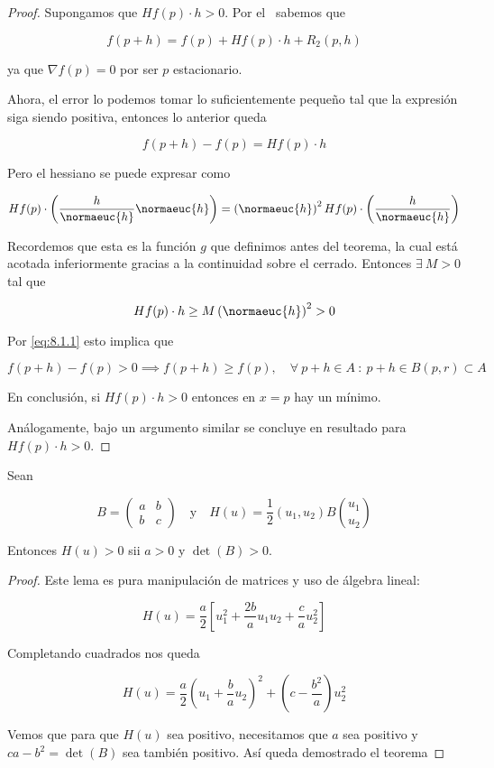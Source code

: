\begin{proof}
    Supongamos que $H f(p) \cdot h > 0$. Por el \Taylor~sabemos que
    
    \[
    f(p + h) = f(p) + H f(p) \cdot h + R_2(p,h)
    \]
    
    ya que $\nabla f(p) = 0$ por ser $p$ estacionario.
    
    Ahora, el error lo podemos tomar lo suficientemente pequeño tal que la expresión siga siendo positiva, entonces lo anterior queda
    
    \begin{equation}\label{eq:8.1.1}
        f(p+h) - f(p) = H f(p) \cdot h
    \end{equation}
    
    Pero el hessiano se puede expresar como
    
    \[
    H f(p) \cdot \left( \dfrac{h}{\normaeuc{h}}\normaeuc{h} \right) = \left(\normaeuc{h}\right)^2 H f(p) \cdot \left( \dfrac{h}{\normaeuc{h}} \right)
    \]
    
    Recordemos que esta es la función $g$ que definimos antes del teorema, la cual está acotada inferiormente gracias a la continuidad sobre el cerrado. Entonces $\exists~M > 0$ tal que
    
    \[
    H f(p) \cdot h \geq M \left(\normaeuc{h}\right)^2 > 0
    \]
    
    Por \ref{eq:8.1.1} esto implica que 
    
    \[
    f(p+h) - f(p) > 0 \implies f(p+h) \geq f(p), \quad \forall~p+h \in A~:~p+h \in B(p,r) \subset A
    \]
    
    En conclusión, si $H f(p) \cdot h > 0$ entonces en $x=p$ hay un mínimo.
    
    Análogamente, bajo un argumento similar se concluye en resultado para $H f(p) \cdot h > 0$.
\end{proof}

\begin{lem}
    Sean
    
    \[
    B =
    \begin{pmatrix}
        a & b \\
        b & c
    \end{pmatrix}
    \quad \text{y} \quad H(u) = \frac{1}{2} (u_1, u_2) B \binom{u_1}{u_2}
    \]
    
    Entonces $H(u) > 0$ sii $a > 0$ y $\det(B) > 0$.
\end{lem}

\begin{proof}
    Este lema es pura manipulación de matrices y uso de álgebra lineal:
    
    \[
    H(u) = \frac{a}{2} \left[ u_1^2 + \frac{2b}{a}u_1u_2 + \frac{c}{a}u_2^2 \right]
    \]
    
    Completando cuadrados nos queda
    
    \[
    H(u) = \frac{a}{2} \left( u_1 + \frac{b}{a}u_2 \right)^2 + \left( c - \frac{b^2}{a} \right) u_2^2 
    \]
    
    Vemos que para que $H(u)$ sea positivo, necesitamos que $a$ sea positivo y $ca - b^2 = \det(B)$ sea también positivo. Así queda demostrado el teorema
\end{proof}

